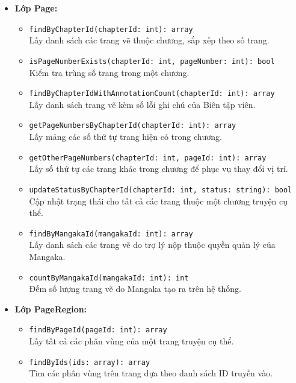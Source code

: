 \begin{itemize}
    \item \textbf{Lớp Page:}
    \begin{itemize}
        \item \texttt{findByChapterId(chapterId: int): array}\\
            Lấy danh sách các trang vẽ thuộc chương, sắp xếp theo số trang.
        \item \texttt{isPageNumberExists(chapterId: int, pageNumber: int): bool}\\
            Kiểm tra trùng số trang trong một chương.
        \item \texttt{findByChapterIdWithAnnotationCount(chapterId: int): array}\\
            Lấy danh sách trang vẽ kèm số lỗi ghi chú của Biên tập viên.
        \item \texttt{getPageNumbersByChapterId(chapterId: int): array}\\
            Lấy mảng các số thứ tự trang hiện có trong chương.
        \item \texttt{getOtherPageNumbers(chapterId: int, pageId: int): array}\\
            Lấy số thứ tự các trang khác trong chương để phục vụ thay đổi vị trí.
        \item \texttt{updateStatusByChapterId(chapterId: int, status: string): bool}\\
            Cập nhật trạng thái cho tất cả các trang thuộc một chương truyện cụ thể.
        \item \texttt{findByMangakaId(mangakaId: int): array}\\
            Lấy danh sách các trang vẽ do trợ lý nộp thuộc quyền quản lý của Mangaka.
        \item \texttt{countByMangakaId(mangakaId: int): int}\\
            Đếm số lượng trang vẽ do Mangaka tạo ra trên hệ thống.
    \end{itemize}

    \item \textbf{Lớp PageRegion:}
    \begin{itemize}
        \item \texttt{findByPageId(pageId: int): array}\\
            Lấy tất cả các phân vùng của một trang truyện cụ thể.
        \item \texttt{findByIds(ids: array): array}\\
            Tìm các phân vùng trên trang dựa theo danh sách ID truyền vào.
    \end{itemize}


\end{itemize}
